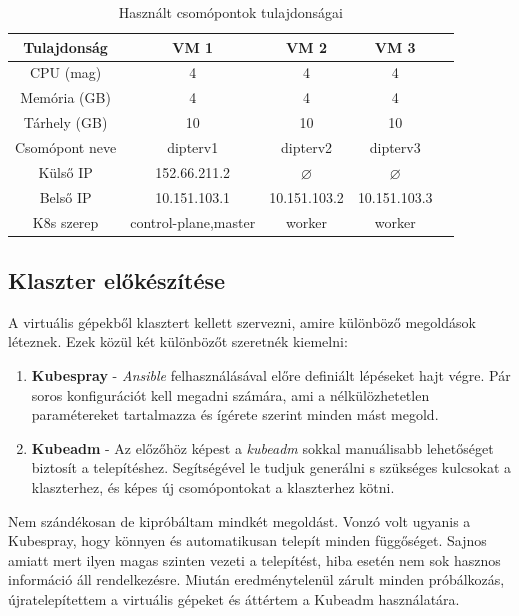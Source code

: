 \begin{table}[ht]
\centering
  \begin{tabular}{c|cccc}
	  Tulajdonság & VM 1 & VM 2 & VM 3 \\
    \hline
	CPU (mag) & 4 & 4 & 4 \\ 
	Memória (GB) & 4 & 4 & 4 \\
	Tárhely (GB) & 10 & 10 & 10 \\  
	Csomópont neve & dipterv1 & dipterv2 & dipterv3 \\ 
	Külső IP & 152.66.211.2 & $\varnothing$ & $\varnothing$ \\ 
	Belső IP & 10.151.103.1 & 10.151.103.2 & 10.151.103.3 \\
	K8s szerep& control-plane,master & worker & worker \\
  \end{tabular}
  
  \caption{Használt csomópontok tulajdonságai}
\label{tab:nodes}
\end{table}

\subsection{Klaszter előkészítése}
A virtuális gépekből klasztert kellett szervezni, amire különböző megoldások léteznek.\citep{kubernetesInstall} 
Ezek közül két különbözőt szeretnék kiemelni:

\begin{enumerate}

  \item \textbf{Kubespray} - \textit{Ansible} felhasználásával előre definiált lépéseket hajt végre. Pár soros konfigurációt kell megadni számára, ami a nélkülözhetetlen paramétereket tartalmazza és ígérete szerint minden mást megold.
  
  \item \textbf{Kubeadm} - Az előzőhöz képest a \textit{kubeadm} sokkal manuálisabb lehetőséget biztosít a telepítéshez. 
  Segítségével le tudjuk generálni s szükséges kulcsokat a klaszterhez, és képes új csomópontokat a klaszterhez kötni.
  
\end{enumerate}

Nem szándékosan de kipróbáltam mindkét megoldást.
Vonzó volt ugyanis a Kubespray, hogy könnyen és automatikusan telepít minden függőséget. 
Sajnos amiatt mert ilyen magas szinten vezeti a telepítést, hiba esetén nem sok hasznos információ áll rendelkezésre.
Miután eredménytelenül zárult minden próbálkozás, újratelepítettem a virtuális gépeket és áttértem a Kubeadm használatára. 

